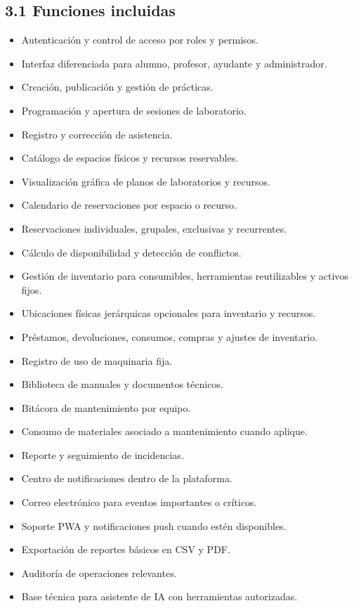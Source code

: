 \documentclass[12pt]{article}
\begin{document}
\subsection*{3.1 Funciones incluidas}

\begin{itemize}[leftmargin=1.2cm]
    \item Autenticación y control de acceso por roles y permisos.
    \item Interfaz diferenciada para alumno, profesor, ayudante y administrador.
    \item Creación, publicación y gestión de prácticas.
    \item Programación y apertura de sesiones de laboratorio.
    \item Registro y corrección de asistencia.
    \item Catálogo de espacios físicos y recursos reservables.
    \item Visualización gráfica de planos de laboratorios y recursos.
    \item Calendario de reservaciones por espacio o recurso.
    \item Reservaciones individuales, grupales, exclusivas y recurrentes.
    \item Cálculo de disponibilidad y detección de conflictos.
    \item Gestión de inventario para consumibles, herramientas reutilizables y activos fijos.
    \item Ubicaciones físicas jerárquicas opcionales para inventario y recursos.
    \item Préstamos, devoluciones, consumos, compras y ajustes de inventario.
    \item Registro de uso de maquinaria fija.
    \item Biblioteca de manuales y documentos técnicos.
    \item Bitácora de mantenimiento por equipo.
    \item Consumo de materiales asociado a mantenimiento cuando aplique.
    \item Reporte y seguimiento de incidencias.
    \item Centro de notificaciones dentro de la plataforma.
    \item Correo electrónico para eventos importantes o críticos.
    \item Soporte PWA y notificaciones push cuando estén disponibles.
    \item Exportación de reportes básicos en CSV y PDF.
    \item Auditoría de operaciones relevantes.
    \item Base técnica para asistente de IA con herramientas autorizadas.
\end{itemize}
\end{document}
